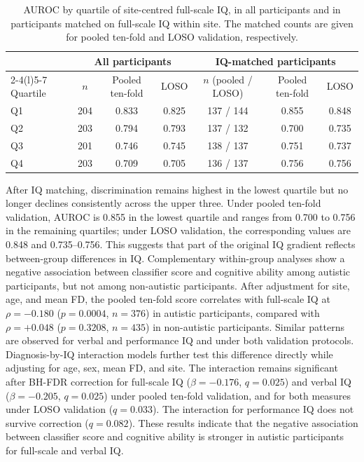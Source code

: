 \begin{table}[t]
\centering
\caption{AUROC by quartile of site-centred full-scale IQ, in all participants and in
participants matched on full-scale IQ within site. The matched counts are given for pooled
ten-fold and LOSO validation, respectively.}
\label{tab:iq-quartiles}
\small
\begin{tabular}{@{}lcccccc@{}}
\toprule
 & \multicolumn{3}{c}{All participants} & \multicolumn{3}{c}{IQ-matched participants} \\
\cmidrule(lr){2-4}\cmidrule(l){5-7}
Quartile & $n$ & Pooled ten-fold & LOSO & $n$ (pooled / LOSO) & Pooled ten-fold & LOSO \\
\midrule
Q1 & 204 & 0.833 & 0.825 & 137 / 144 & 0.855 & 0.848 \\
Q2 & 203 & 0.794 & 0.793 & 137 / 132 & 0.700 & 0.735 \\
Q3 & 201 & 0.746 & 0.745 & 138 / 137 & 0.751 & 0.737 \\
Q4 & 203 & 0.709 & 0.705 & 136 / 137 & 0.756 & 0.756 \\
\bottomrule
\end{tabular}
\end{table}

After IQ matching, discrimination remains highest in the lowest quartile but no longer declines consistently across the upper three. Under pooled ten-fold validation, AUROC is 0.855 in the lowest quartile and ranges from 0.700 to 0.756 in the remaining quartiles; under LOSO validation, the corresponding values are 0.848 and 0.735--0.756. This suggests that part of the original IQ gradient reflects between-group differences in IQ. Complementary within-group analyses show a negative association between classifier score and cognitive ability among autistic participants, but not among non-autistic participants. After adjustment for site, age, and mean FD, the pooled ten-fold score correlates with full-scale IQ at $\rho=-0.180$ ($p=0.0004$, $n=376$) in autistic participants, compared with $\rho=+0.048$ ($p=0.3208$, $n=435$) in non-autistic participants. Similar patterns are observed for verbal and performance IQ and under both validation protocols. Diagnosis-by-IQ interaction models further test this difference directly while adjusting for age, sex, mean FD, and site. The interaction remains significant after BH-FDR correction for full-scale IQ ($\beta=-0.176$, $q=0.025$) and verbal IQ ($\beta=-0.205$, $q=0.025$) under pooled ten-fold validation, and for both measures under LOSO validation ($q=0.033$). The interaction for performance IQ does not survive correction ($q=0.082$). These results indicate that the negative association between classifier score and cognitive ability is stronger in autistic participants for full-scale and verbal IQ.

